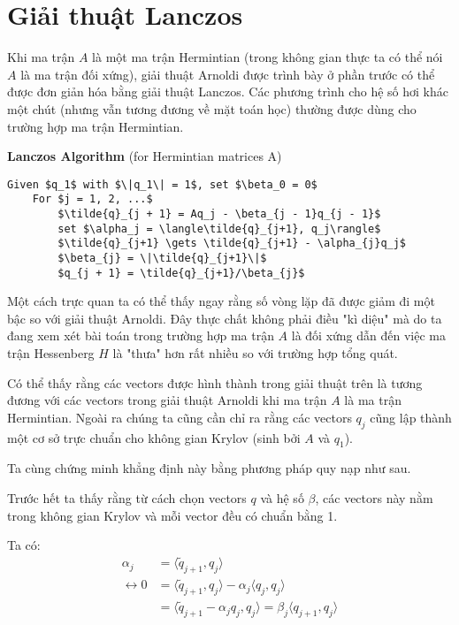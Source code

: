 \section{Giải thuật Lanczos}
Khi ma trận $A$ là một ma trận Hermintian (trong không gian thực ta có thể 
nói $A$ là ma trận đối xứng), giải thuật Arnoldi được trình bày ở phần trước 
có thể được đơn giản hóa bằng giải thuật Lanczos. Các phương trình cho hệ số 
hơi khác một chút (nhưng vẫn tương đương về mặt toán học) thường được dùng 
cho trường hợp ma trận Hermintian.

\textbf{Lanczos Algorithm} (for Hermintian matrices A)
\begin{lstlisting}[style=algo]
    Given $q_1$ with $\|q_1\| = 1$, set $\beta_0 = 0$
    For $j = 1, 2, ...$
        $\tilde{q}_{j + 1} = Aq_j - \beta_{j - 1}q_{j - 1}$
        set $\alpha_j = \langle\tilde{q}_{j+1}, q_j\rangle$
        $\tilde{q}_{j+1} \gets \tilde{q}_{j+1} - \alpha_{j}q_j$
        $\beta_{j} = \|\tilde{q}_{j+1}\|$
        $q_{j + 1} = \tilde{q}_{j+1}/\beta_{j}$
\end{lstlisting}

Một cách trực quan ta có thể thấy ngay rằng số vòng lặp đã được giảm đi một bậc so 
với giải thuật Arnoldi. Đây thực chất không phải điều "kì diệu" mà do ta đang xem xét
bài toán trong trường hợp ma trận $A$ là đối xứng dẫn đến việc ma trận Hessenberg $H$ 
là "thưa" hơn rất nhiều so với trường hợp tổng quát.

Có thể thấy rằng các vectors được hình thành 
trong giải thuật trên là tương đương với các vectors trong giải thuật Arnoldi 
khi ma trận $A$ là ma trận Hermintian. Ngoài ra chúng ta cũng cần chỉ ra rằng 
các vectors $q_j$ cũng lập thành một cơ sở trực chuẩn cho không gian Krylov (sinh 
bởi $A$ và $q_1$).

Ta cùng chứng minh khẳng định này bằng phương pháp quy nạp như sau.

Trước hết ta thấy rằng từ cách chọn vectors $q$ và hệ số $\beta$, các vectors 
này nằm trong không gian Krylov và mỗi vector đều có chuẩn bằng 1.

Ta có:
\begin{equation*}
    \begin{split}
        \alpha_j &= \langle \tilde{q}_{j+1}, q_j \rangle \\
        \leftrightarrow 0 &= \langle \tilde{q}_{j+1}, q_j \rangle - \alpha_j \langle q_j, q_j \rangle \\
        &= \langle \tilde{q}_{j+1} - \alpha_j q_j, q_j \rangle = \beta_j \langle q_{j+1}, q_j \rangle
    \end{split}
\end{equation*}

